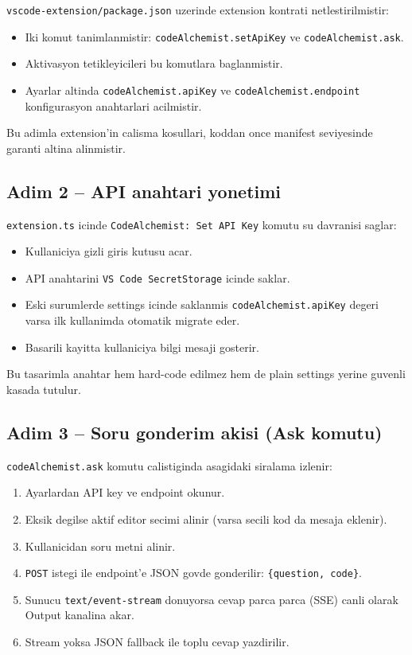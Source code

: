 \documentclass[11pt,a4paper]{article}
\begin{document}
\texttt{vscode-extension/package.json} uzerinde extension kontrati netlestirilmistir:
\begin{itemize}[leftmargin=1.5em]
	\item Iki komut tanimlanmistir: \texttt{codeAlchemist.setApiKey} ve \texttt{codeAlchemist.ask}.
	\item Aktivasyon tetikleyicileri bu komutlara baglanmistir.
	\item Ayarlar altinda \texttt{codeAlchemist.apiKey} ve \texttt{codeAlchemist.endpoint} konfigurasyon anahtarlari acilmistir.
\end{itemize}

Bu adimla extension'in calisma kosullari, koddan once manifest seviyesinde garanti altina alinmistir.

\subsection{Adim 2 -- API anahtari yonetimi}

\texttt{extension.ts} icinde \texttt{CodeAlchemist: Set API Key} komutu su davranisi saglar:
\begin{itemize}[leftmargin=1.5em]
	\item Kullaniciya gizli giris kutusu acar.
	\item API anahtarini \texttt{VS Code SecretStorage} icinde saklar.
	\item Eski surumlerde settings icinde saklanmis \texttt{codeAlchemist.apiKey} degeri varsa ilk kullanimda otomatik migrate eder.
	\item Basarili kayitta kullaniciya bilgi mesaji gosterir.
\end{itemize}

Bu tasarimla anahtar hem hard-code edilmez hem de plain settings yerine guvenli kasada tutulur.

\subsection{Adim 3 -- Soru gonderim akisi (Ask komutu)}

\texttt{codeAlchemist.ask} komutu calistiginda asagidaki siralama izlenir:
\begin{enumerate}[leftmargin=1.5em]
	\item Ayarlardan API key ve endpoint okunur.
	\item Eksik degilse aktif editor secimi alinir (varsa secili kod da mesaja eklenir).
	\item Kullanicidan soru metni alinir.
	\item \texttt{POST} istegi ile endpoint'e JSON govde gonderilir: \texttt{\{question, code\}}.
	\item Sunucu \texttt{text/event-stream} donuyorsa cevap parca parca (SSE) canli olarak Output kanalina akar.
	\item Stream yoksa JSON fallback ile toplu cevap yazdirilir.
\end{enumerate}
\end{document}
